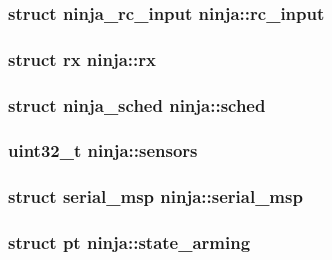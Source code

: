 \hypertarget{structninja_a1805a02bb889413e911c821b21fd3470}{
\subsubsection[{rc\+\_\+input}]{\setlength{\rightskip}{0pt plus 5cm}struct {\bf ninja\+\_\+rc\+\_\+input} ninja\+::rc\+\_\+input}}\label{structninja_a1805a02bb889413e911c821b21fd3470}
\hypertarget{structninja_a15c6dfd2dd339f6161ff1f89a2d13fb1}{
\subsubsection[{rx}]{\setlength{\rightskip}{0pt plus 5cm}struct {\bf rx} ninja\+::rx}}\label{structninja_a15c6dfd2dd339f6161ff1f89a2d13fb1}
\hypertarget{structninja_a7ccd139def1612b83eea1481ff322112}{
\subsubsection[{sched}]{\setlength{\rightskip}{0pt plus 5cm}struct {\bf ninja\+\_\+sched} ninja\+::sched}}\label{structninja_a7ccd139def1612b83eea1481ff322112}
\hypertarget{structninja_a978ed6b6ca928428db7481116e618b67}{
\subsubsection[{sensors}]{\setlength{\rightskip}{0pt plus 5cm}uint32\+\_\+t ninja\+::sensors}}\label{structninja_a978ed6b6ca928428db7481116e618b67}
\hypertarget{structninja_a6634274e49180cc881d0145ded10a967}{
\subsubsection[{serial\+\_\+msp}]{\setlength{\rightskip}{0pt plus 5cm}struct {\bf serial\+\_\+msp} ninja\+::serial\+\_\+msp}}\label{structninja_a6634274e49180cc881d0145ded10a967}
\hypertarget{structninja_aa1a183039a021e827be1869a92b5ee4a}{
\subsubsection[{state\+\_\+arming}]{\setlength{\rightskip}{0pt plus 5cm}struct {\bf pt} ninja\+::state\+\_\+arming}}\label{structninja_aa1a183039a021e827be1869a92b5ee4a}
